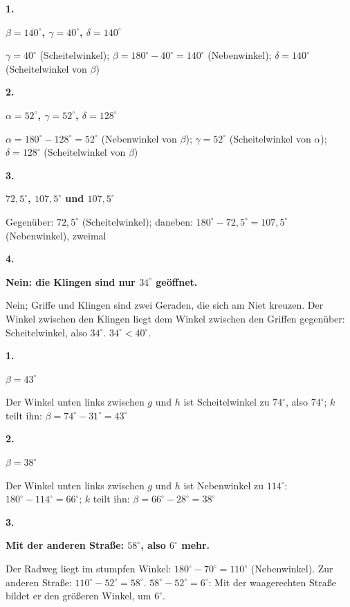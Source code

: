 \documentclass[11pt]{article}
\newcommand{\lsg}[3]{\par\noindent\begin{minipage}[t]{9mm}\textbf{#1}\end{minipage}%
  \begin{minipage}[t]{52mm}\raggedright\bfseries\boldmath #2\end{minipage}\hspace{3mm}%
  \begin{minipage}[t]{\dimexpr\linewidth-64mm\relax}\raggedright\small #3\end{minipage}\par\vspace{4pt}}
\newlength{\kr}
\begin{document}
\par\smallskip
{}\par
\par\Needspace{25mm}\vspace{6pt}\noindent\colorbox{black!12}{}\hspace{2mm}{\bfseries Scheitel- und Nebenwinkel}\par\vspace{4pt}
\lsg{1.}{$\beta = 140^\circ$, $\gamma = 40^\circ$, $\delta = 140^\circ$}{$\gamma = 40^\circ$ (Scheitelwinkel); $\beta = 180^\circ - 40^\circ = 140^\circ$ (Nebenwinkel); $\delta = 140^\circ$ (Scheitelwinkel von $\beta$)}
\lsg{2.}{$\alpha = 52^\circ$, $\gamma = 52^\circ$, $\delta = 128^\circ$}{$\alpha = 180^\circ - 128^\circ = 52^\circ$ (Nebenwinkel von $\beta$); $\gamma = 52^\circ$ (Scheitelwinkel von $\alpha$); $\delta = 128^\circ$ (Scheitelwinkel von $\beta$)}
\lsg{3.}{$72{,}5^\circ$, $107{,}5^\circ$ und $107{,}5^\circ$}{Gegenüber: $72{,}5^\circ$ (Scheitelwinkel); daneben: $180^\circ - 72{,}5^\circ = 107{,}5^\circ$ (Nebenwinkel), zweimal}
\lsg{4.}{Nein: die Klingen sind nur $34^\circ$ geöffnet.}{Nein; Griffe und Klingen sind zwei Geraden, die sich am Niet kreuzen. Der Winkel zwischen den Klingen liegt dem Winkel zwischen den Griffen gegenüber: Scheitelwinkel, also $34^\circ$. $34^\circ < 40^\circ$.}
\par\Needspace{25mm}\vspace{6pt}\noindent\colorbox{black!12}{}\hspace{2mm}{\bfseries Kreuzungen in Figuren}\par\vspace{4pt}
\lsg{1.}{$\beta = 43^\circ$}{Der Winkel unten links zwischen $g$ und $h$ ist Scheitelwinkel zu $74^\circ$, also $74^\circ$; $k$ teilt ihn: $\beta = 74^\circ - 31^\circ = 43^\circ$}
\lsg{2.}{$\beta = 38^\circ$}{Der Winkel unten links zwischen $g$ und $h$ ist Nebenwinkel zu $114^\circ$: $180^\circ - 114^\circ = 66^\circ$; $k$ teilt ihn: $\beta = 66^\circ - 28^\circ = 38^\circ$}
\lsg{3.}{Mit der anderen Straße: $58^\circ$, also $6^\circ$ mehr.}{Der Radweg liegt im stumpfen Winkel: $180^\circ - 70^\circ = 110^\circ$ (Nebenwinkel). Zur anderen Straße: $110^\circ - 52^\circ = 58^\circ$. $58^\circ - 52^\circ = 6^\circ$: Mit der waagerechten Straße bildet er den größeren Winkel, um $6^\circ$.}
\end{document}
